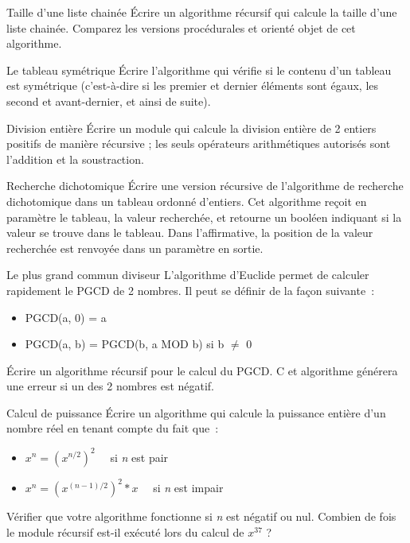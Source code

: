 	\begin{Exercice}{Taille d'une liste chainée}
		Écrire un algorithme récursif qui calcule la taille d'une liste 
		chainée. Comparez les versions procédurales et orienté
		objet de cet algorithme.
	\end{Exercice}
	
	\begin{Exercice}{Le tableau symétrique}
		Écrire l'algorithme qui vérifie si le contenu d'un tableau 
		est symétrique (c'est-à-dire si les premier et dernier
		éléments sont égaux, les second et avant-dernier, et ainsi de suite).
	\end{Exercice}

	\begin{Exercice}{Division entière}
		Écrire un module qui calcule la division entière de 2 entiers 
		positifs de manière récursive ; les seuls opérateurs
		arithmétiques autorisés sont l'addition et la soustraction.
	\end{Exercice}

	\begin{Exercice}{Recherche dichotomique}
		Écrire une version récursive de l'algorithme de recherche 
		dichotomique dans un tableau ordonné d'entiers. Cet algorithme
		reçoit en paramètre le tableau, la valeur recherchée, et 
		retourne un booléen indiquant si la valeur se trouve dans le
		tableau. Dans l'affirmative, la position de la valeur recherchée 
		est renvoyée dans un paramètre en sortie.
	\end{Exercice}
	
	\begin{Exercice}{Le plus grand commun diviseur}
		L'algorithme d'Euclide permet de calculer rapidement le 
		PGCD de 2 nombres. Il peut se définir de la façon suivante~:

		\begin{itemize}
			\item {
				PGCD(a, 0) = a}
			\item {
				PGCD(a, b) = PGCD(b, a MOD b) si b ${\neq}$ 0}
		\end{itemize}
	
		Écrire un algorithme récursif pour le calcul du PGCD. C
		et algorithme générera une erreur si un des 2 nombres est
		négatif.
	\end{Exercice}
	
	\begin{Exercice}{Calcul de puissance}
		Écrire un algorithme qui calcule la puissance entière 
		d'un nombre réel en tenant compte du fait que~:

		\begin{itemize}
			\item {
				$x^n = (x^{n/2})^2$	\ \ si \textit{n} est pair}
			\item {
				$x^n = {(x^{(n-1)/2})^2}*x$ \ \ si \textit{n} est impair}
		\end{itemize}

		Vérifier que votre algorithme fonctionne si \textit{n} 
		est négatif ou nul. Combien de fois le module récursif est-il
		exécuté lors du calcul de $x^{37}$ ?
	\end{Exercice}
	
